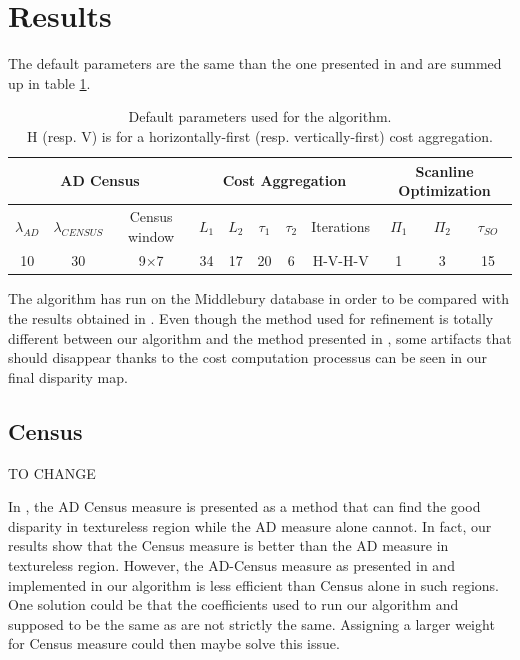 \documentclass{ipol}
\begin{document}
\newpage

\section{Results}

The default parameters are the same than the one presented in \cite{adCensus} and are summed up in table \ref{params}.
\begin{table}[htbp]
\begin{center}
  \begin{tabular}{||c|c|c||c|c|c|c|c||c|c|c||}
		\hline
		\multicolumn{3}{||c||}{AD Census} & \multicolumn{5}{c||}{Cost Aggregation} & \multicolumn{3}{c||}{Scanline Optimization}\\
		\hline
		$\lambda_{AD}$ & $\lambda_{CENSUS}$ & Census window & $L_1$ & $L_2$ & $\tau_1$ & $\tau_2$ & Iterations & $\Pi_1$ & $\Pi_2$ & $\tau_{SO}$\\
		\hline
		10 & 30 & 9$\times$7 & 34 & 17 & 20 & 6 & H-V-H-V & 1 & 3 & 15\\
		\hline
\end{tabular}
\end{center}
\caption{Default parameters used for the algorithm.\\ H (resp. V) is for a horizontally-first (resp. vertically-first) cost aggregation.}
\label{params}
\end{table}

The algorithm has run on the Middlebury database in order to be compared with the results obtained in \cite{adCensus}. Even though the method used for refinement is totally different between our algorithm and the method presented in \cite{adCensus}, some artifacts that should disappear thanks to the cost computation processus can be seen in our final disparity map.

\subsection{Census}

TO CHANGE

In \cite{adCensus}, the AD Census measure is presented as a method that can find the good disparity in textureless region while the AD measure alone cannot. In fact, our results show that the Census measure is better than the AD measure in textureless region. However, the AD-Census measure as presented in \cite{adCensus} and implemented in our algorithm is less efficient than Census alone in such regions. One solution could be that the coefficients used to run our algorithm and supposed to be the same as \cite{adCensus} are not strictly the same. Assigning a larger weight for Census measure could then maybe solve this issue.
\end{document}
